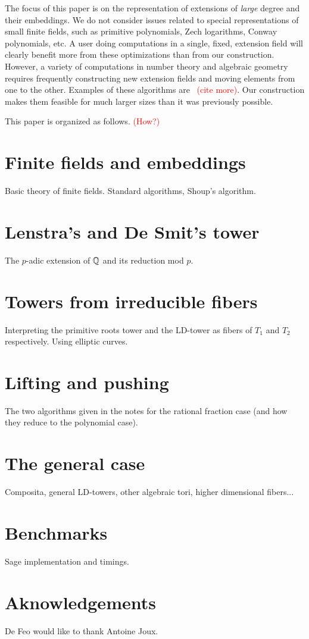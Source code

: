\documentclass{sig-alternate}
\newcommand{\todo}[1]{\textcolor{red}{(#1)}}
\begin{document}
The focus of this paper is on the representation of extensions of
\emph{large} degree and their embeddings. We do not consider issues
related to special representations of small finite fields, such as
primitive polynomials, Zech logarithms, Conway polynomials, etc. A
user doing computations in a single, fixed, extension field will
clearly benefit more from these optimizations than from our
construction. However, a variety of computations in number theory and
algebraic geometry requires frequently constructing new extension
fields and moving elements from one to the other. Examples of these
algorithms are~\cite{df10} \todo{cite more}. Our construction makes
them feasible for much larger sizes than it was previously possible.

This paper is organized as follows. \todo{How?}


\section{Finite fields and embeddings}
\label{sec:finite-field-embedd}
Basic theory of finite fields. Standard algorithms, Shoup's algorithm.


\section{Lenstra's and De Smit's tower}
\label{sec:LDtower}
The $p$-adic extension of $\mathbb{Q}$ and its reduction mod $p$.


\section{Towers from irreducible fibers}
\label{sec:fibers}
Interpreting the primitive roots tower and the LD-tower as fibers of
$T_1$ and $T_2$ respectively. Using elliptic curves.



\section{Lifting and pushing}
\label{sec:lift-push}

The two algorithms given in the notes for the rational fraction case
(and how they reduce to the polynomial case).


\section{The general case}
\label{sec:general}

Composita, general LD-towers, other algebraic tori, higher dimensional
fibers...


\section{Benchmarks}
\label{sec:bench}

Sage implementation and timings.


\section{Aknowledgements}
De Feo would like to thank Antoine Joux.



\end{document}
